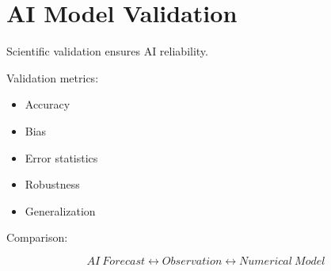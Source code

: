 \section{AI Model Validation}


Scientific validation ensures AI reliability.



Validation metrics:


\begin{itemize}

\item Accuracy

\item Bias

\item Error statistics

\item Robustness

\item Generalization

\end{itemize}



Comparison:


\[
AI\ Forecast
\leftrightarrow
Observation
\leftrightarrow
Numerical\ Model
\]
